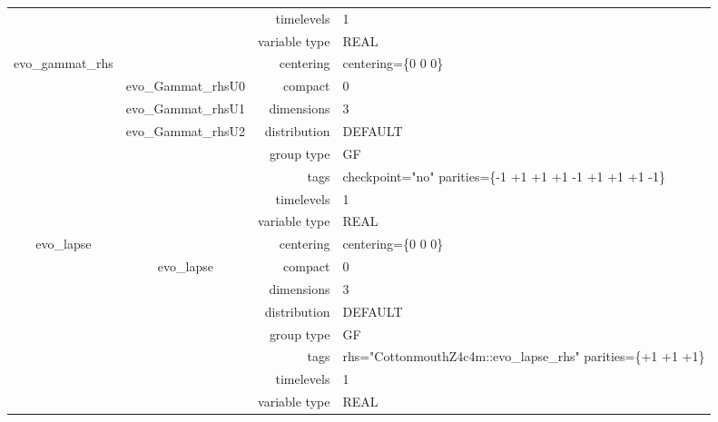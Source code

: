 \documentclass{article}
\begin{document}
\begin{tabular*}{150mm}{|c|c@{\extracolsep{\fill}}|rl|}
 &  & timelevels & 1 \\ 
 &  & variable type & REAL \\ 
\hline 
evo\_gammat\_rhs &  & centering & centering=\{0 0 0\} \\ 
 & evo\_Gammat\_rhsU0 & compact & 0 \\ 
 & evo\_Gammat\_rhsU1 & dimensions & 3 \\ 
 & evo\_Gammat\_rhsU2 & distribution & DEFAULT \\ 
 &  & group type & GF \\ 
 &  & tags & checkpoint="no" parities=\{-1 +1 +1  +1 -1 +1  +1 +1 -1\} \\ 
 &  & timelevels & 1 \\ 
 &  & variable type & REAL \\ 
\hline 
evo\_lapse &  & centering & centering=\{0 0 0\} \\ 
 & evo\_lapse & compact & 0 \\ 
 &  & dimensions & 3 \\ 
 &  & distribution & DEFAULT \\ 
 &  & group type & GF \\ 
 &  & tags & rhs="CottonmouthZ4c4m::evo\_lapse\_rhs" parities=\{+1 +1 +1\} \\ 
 &  & timelevels & 1 \\ 
 &  & variable type & REAL \\ 
\hline 
\end{tabular*} 



\vspace{5mm}
\vspace{5mm}
\end{document}
